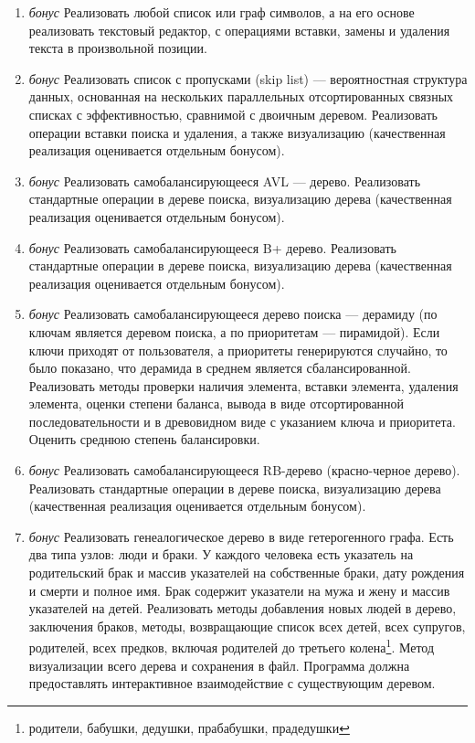 \documentclass[12pt]{article}
\begin{document}
\begin{enumerate}
 \item \emph{бонус} Реализовать любой список или граф символов, а на его основе реализовать текстовый редактор, с 
операциями вставки, замены и удаления текста в произвольной позиции. 
 \item \emph{бонус} Реализовать список с пропусками (skip list) --- вероятностная структура данных, основанная на 
нескольких параллельных отсортированных связных списках с эффективностью, сравнимой с двоичным деревом. Реализовать 
операции вставки поиска и удаления, а также визуализацию (качественная реализация оценивается отдельным бонусом).
 \item \emph{бонус} Реализовать самобалансирующееся AVL --- дерево. Реализовать стандартные операции в дереве поиска, 
визуализацию дерева (качественная реализация оценивается 
 отдельным бонусом).
 \item \emph{бонус} Реализовать самобалансирующееся B+ дерево. Реализовать стандартные операции в дереве поиска, 
визуализацию дерева (качественная реализация оценивается 
 отдельным бонусом).
 \item \emph{бонус} Реализовать самобалансирующееся дерево поиска --- дерамиду (по ключам является деревом поиска, а по 
приоритетам --- пирамидой). Если ключи приходят от пользователя, а 
 приоритеты генерируются случайно, то было показано, что дерамида в среднем является сбалансированной. Реализовать 
методы проверки наличия элемента, вставки элемента, 
 удаления элемента, оценки степени баланса, вывода в виде отсортированной последовательности и в древовидном виде с 
указанием ключа и приоритета. Оценить среднюю степень 
 балансировки.
 \item \emph{бонус} Реализовать самобалансирующееся RB-дерево (красно-черное дерево). Реализовать стандартные операции 
в дереве поиска, визуализацию дерева (качественная реализация оценивается 
 отдельным бонусом).
 \item \emph{бонус} Реализовать генеалогическое дерево в виде гетерогенного графа. Есть два типа узлов: люди и браки. У 
каждого человека есть указатель на родительский брак и массив указателей на собственные браки, дату рождения и смерти и 
полное имя. Брак содержит указатели на мужа и жену и массив указателей на детей. Реализовать методы добавления новых 
людей в дерево, заключения браков, методы, возвращающие список всех детей, всех супругов, родителей, всех предков, 
включая родителей до третьего колена\footnote {родители, бабушки, дедушки, прабабушки, прадедушки}. Метод визуализации 
всего дерева и сохранения в файл. Программа должна предоставлять интерактивное взаимодействие с существующим деревом.

\end{enumerate}
\end{document}
